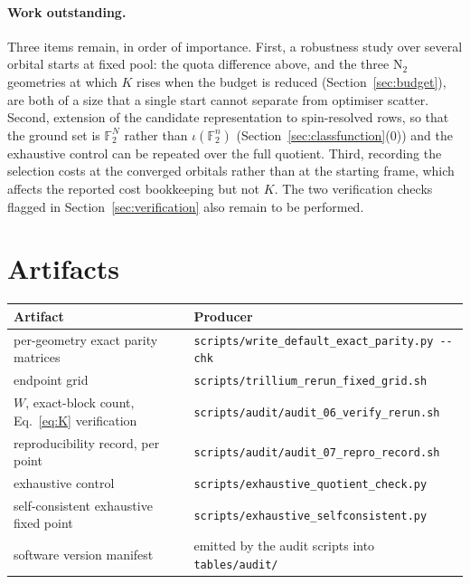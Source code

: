 \documentclass[11pt]{article}
\newcommand{\FF}{\mathbb F_2}
\begin{document}
\paragraph{Work outstanding.}
Three items remain, in order of importance. First, a robustness study over
several orbital starts at fixed pool: the quota difference above, and the three
$\mathrm{N_2}$ geometries at which $K$ rises when the budget is reduced
(Section~\ref{sec:budget}), are both of a size that a single start cannot
separate from optimiser scatter. Second, extension of the candidate
representation to spin-resolved rows, so that the ground set is $\FF^{N}$
rather than $\iota(\FF^{n})$ (Section~\ref{sec:classfunction}(0)) and the
exhaustive control can be repeated over the full quotient. Third, recording the
selection costs at the converged orbitals rather than at the starting frame,
which affects the reported cost bookkeeping but not $K$. The two verification
checks flagged in Section~\ref{sec:verification} also remain to be performed.

\appendix
\section{Artifacts}
\label{sec:artifacts}
\small
\begin{tabular}{@{}p{}p{}@{}}
\toprule
Artifact & Producer \\
\midrule
per-geometry exact parity matrices &
  \texttt{scripts/write\_default\_exact\_parity.py -{}-chk} \\
endpoint grid &
  \texttt{scripts/trillium\_rerun\_fixed\_grid.sh} \\
$W$, exact-block count, Eq.~\eqref{eq:K} verification &
  \texttt{scripts/audit/audit\_06\_verify\_rerun.sh} \\
reproducibility record, per point &
  \texttt{scripts/audit/audit\_07\_repro\_record.sh} \\
exhaustive control &
  \texttt{scripts/exhaustive\_quotient\_check.py} \\
self-consistent exhaustive fixed point &
  \texttt{scripts/exhaustive\_selfconsistent.py} \\
software version manifest &
  emitted by the audit scripts into \texttt{tables/audit/} \\
\bottomrule
\end{tabular}
\normalsize
\end{document}
